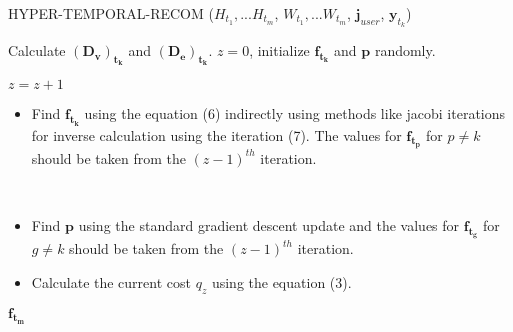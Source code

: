 \documentclass[conference]{IEEEtran}
\begin{document}
\begin{algorithm} %
\caption{HYPER-TEMPORAL-RECOM (${H_{t_1}, ... H_{t_m}}$, ${W_{t_1}, ... W_{t_m}}$, $\mathbf{j}_{user}$, $\mathbf{y}_{t_k}$)} %
\label{alg2} %
\begin{algorithmic} %

\STATE Calculate $\mathbf{(D_v)_{t_k}}$ and $\mathbf{(D_e)_{t_k}}$.
\STATE $z=0$, initialize $\mathbf{f_{t_k}}$ and $\mathbf{p}$ randomly.

\REPEAT
\STATE $z=z+1$


\begin{itemize}
\item{Find $\mathbf{f_{t_k}}$ using the equation (6) indirectly using methods like jacobi iterations for inverse calculation using the iteration (7). The values for $\mathbf{f_{t_p}}$ for $p \neq k$ should be taken from the $(z-1)^{th}$ iteration.}
\end{itemize}

\ENDFOR \\

\begin{itemize}
\item{Find $\mathbf{p}$ using the standard gradient descent update and the values for $\mathbf{f_{t_g}}$ for $g \neq k$ should be taken from the $(z-1)^{th}$ iteration.}
\item{Calculate the current cost $q_z$ using the equation (3).}
\end{itemize}


\RETURN $\mathbf{f_{t_m}}$

\end{algorithmic}
\end{algorithm}
\end{document}
